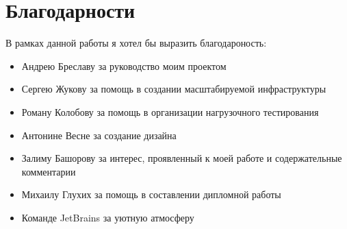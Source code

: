 \chapter*{Благодарности}
В рамках данной работы я хотел бы выразить благодароность:
\begin{itemize}
	\item Андрею Бреславу за руководство моим проектом
	\item Сергею Жукову за помощь в создании масштабируемой инфраструктуры
	\item Роману Колобову за помощь в организации нагрузочного тестирования
	\item Антонине Весне за создание дизайна
	\item Залиму Башорову за интерес, проявленный к моей работе и содержательные комментарии
	\item Михаилу Глухих за помощь в составлении дипломной работы
	\item Команде JetBrains за уютную атмосферу
\end{itemize}
